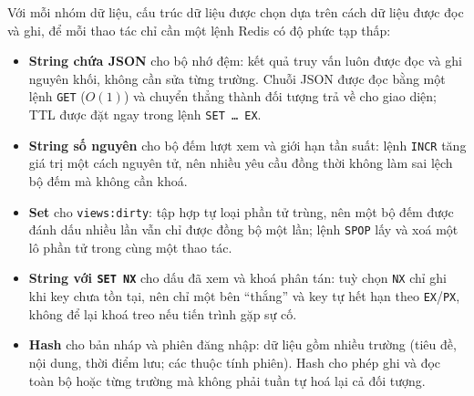 Với mỗi nhóm dữ liệu, cấu trúc dữ liệu được chọn dựa trên cách dữ liệu được đọc và ghi, để mỗi thao tác chỉ cần một lệnh Redis có độ phức tạp thấp:

\begin{itemize}
    \item \textbf{String chứa JSON} cho bộ nhớ đệm: kết quả truy vấn luôn được đọc và ghi nguyên khối, không cần sửa từng trường. Chuỗi JSON được đọc bằng một lệnh \texttt{GET} ($O(1)$) và chuyển thẳng thành đối tượng trả về cho giao diện; TTL được đặt ngay trong lệnh \texttt{SET \ldots{} EX}.
    \item \textbf{String số nguyên} cho bộ đếm lượt xem và giới hạn tần suất: lệnh \texttt{INCR} tăng giá trị một cách nguyên tử, nên nhiều yêu cầu đồng thời không làm sai lệch bộ đếm mà không cần khoá.
    \item \textbf{Set} cho \texttt{views:dirty}: tập hợp tự loại phần tử trùng, nên một bộ đếm được đánh dấu nhiều lần vẫn chỉ được đồng bộ một lần; lệnh \texttt{SPOP} lấy và xoá một lô phần tử trong cùng một thao tác.
    \item \textbf{String với \texttt{SET NX}} cho dấu đã xem và khoá phân tán: tuỳ chọn \texttt{NX} chỉ ghi khi key chưa tồn tại, nên chỉ một bên ``thắng'' và key tự hết hạn theo \texttt{EX}/\texttt{PX}, không để lại khoá treo nếu tiến trình gặp sự cố.
    \item \textbf{Hash} cho bản nháp và phiên đăng nhập: dữ liệu gồm nhiều trường (tiêu đề, nội dung, thời điểm lưu; các thuộc tính phiên). Hash cho phép ghi và đọc toàn bộ hoặc từng trường mà không phải tuần tự hoá lại cả đối tượng.
\end{itemize}


